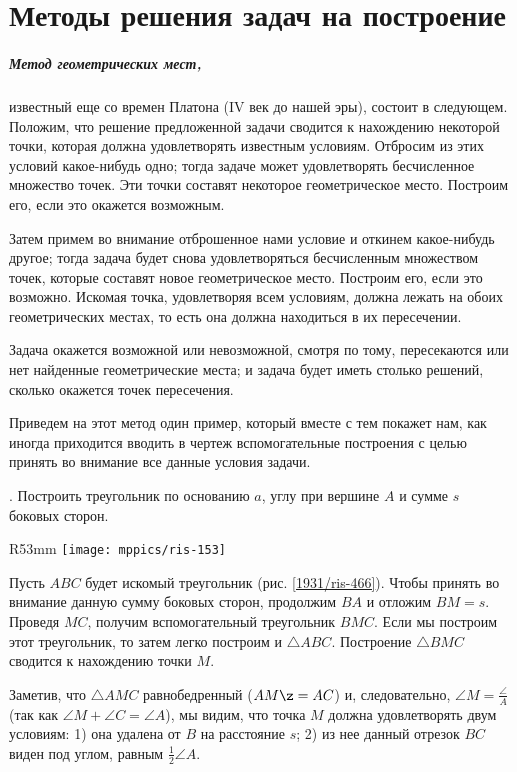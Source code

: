 \appendix
\chapter{Методы решения задач на построение}

\paragraph{Метод геометрических мест,} известный еще со времен Платона (IV век до нашей эры), состоит в следующем.
Положим, что решение предложенной задачи сводится к нахождению некоторой точки, которая должна удовлетворять известным условиям.
Отбросим из этих условий какое-нибудь одно;
тогда задаче может удовлетворять бесчисленное множество точек.
Эти точки составят некоторое геометрическое место.
Построим его, если это окажется возможным.

Затем примем во внимание отброшенное нами условие и откинем какое-нибудь другое; 
тогда задача будет снова удовлетворяться бесчисленным множеством точек, которые составят новое геометрическое место.
Построим его, если это возможно.
Искомая точка, удовлетворяя всем условиям, должна лежать на обоих геометрических местах, то есть она должна находиться в их пересечении.

Задача окажется возможной или невозможной, смотря по тому, пересекаются или нет найденные геометрические места; и задача будет иметь столько решений, сколько окажется точек пересечения.

Приведем на этот метод один пример, который вместе с тем покажет нам, как иногда приходится вводить в чертеж вспомогательные построения с целью принять во внимание все данные условия задачи.

\smallskip
{}. Построить треугольник по основанию $a$, углу при вершине $A$ и сумме $s$ боковых сторон.

\begin{wrapfigure}{R}{53mm}
\centering
\texttt{[image: mppics/ris-153]}
\caption{}\label{1931/ris-466}
\end{wrapfigure}

Пусть $ABC$ будет искомый треугольник (рис. \ref{1931/ris-466}).
Чтобы принять во внимание данную сумму боковых сторон, продолжим $BA$ и отложим $BM=s$.
Проведя $MC$, получим вспомогательный треугольник $BMC$.
Если мы построим этот треугольник, то затем легко построим и $\triangle ABC$.
Построение $\triangle  BMC$ сводится к нахождению точки $M$.

Заметив, что $\triangle AMC$ равнобедренный ($AM\z=AC$) и, следовательно, $\angle M = \tfrac\angle A$ (так как $\angle M+\angle C= \angle A$), мы видим, что точка $M$ должна удовлетворять двум условиям: 
1) она удалена от $B$ на расстояние $s$; 
2) из нее данный отрезок $BC$ виден под углом, равным $\tfrac12\angle A$. 

